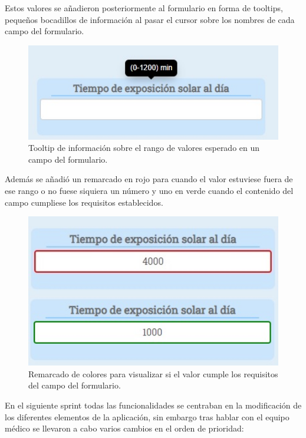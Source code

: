 Estos valores se añadieron posteriormente al formulario en forma de tooltips, pequeños bocadillos de información al pasar el cursor sobre los nombres de cada campo del formulario.

\begin{figure}[h]
    \centering
     \includegraphics[width=1\textwidth]{images/tooltip.jpg}
    \caption{Tooltip de información sobre el rango de valores esperado en un campo del formulario.}
\end{figure}

Además se añadió un remarcado en rojo para cuando el valor estuviese fuera de ese rango o no fuese siquiera un número y uno en verde cuando el contenido del campo cumpliese los requisitos establecidos.

\begin{figure}[h]
    \centering
     \includegraphics[width=1\textwidth]{images/remarcadoRojo.jpg}
    \caption{Remarcado de colores para visualizar si el valor cumple los requisitos del campo del formulario.}
\end{figure}
\newpage

En el siguiente sprint todas las funcionalidades se centraban en la modificación de los diferentes elementos de la aplicación, sin embargo tras hablar con el equipo médico se llevaron a cabo varios cambios en el orden de prioridad:


